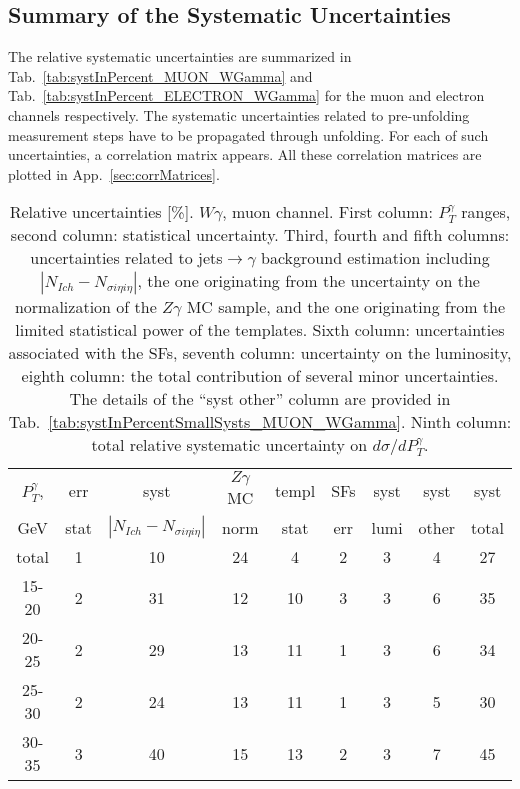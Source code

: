 \subsection{Summary of the Systematic Uncertainties}
\label{sec:Systematics_summary}

The relative systematic uncertainties are summarized in Tab.~\ref{tab:systInPercent_MUON_WGamma} and Tab.~\ref{tab:systInPercent_ELECTRON_WGamma} for the muon and electron channels respectively. The systematic uncertainties related to pre-unfolding measurement steps have to be propagated through unfolding. For each of such uncertainties, a correlation matrix appears. All these correlation matrices are plotted in App.~\ref{sec:corrMatrices}.

\begin{table}[h]
  \scriptsize
  \begin{center}
  \caption{Relative uncertainties [\%]. $W\gamma$, muon channel. First column: $P_T^{\gamma}$ ranges, second column: statistical uncertainty. Third, fourth and fifth columns: uncertainties related to jets$\rightarrow\gamma$ background estimation including $|N_{Ich}-N_{\sigma i\eta i\eta}|$, the one originating from the uncertainty on the normalization of the $Z\gamma$ MC sample, and the one originating from the limited statistical power of the templates. Sixth column: uncertainties associated with the SFs, seventh column: uncertainty on the luminosity, eighth column: the total contribution of several minor uncertainties. The details of the ``syst other'' column are provided in Tab.~\ref{tab:systInPercentSmallSysts_MUON_WGamma}. Ninth column: total relative systematic uncertainty on $d\sigma/dP_T^{\gamma}$.}
   \begin{tabular}{|c|c|c|c|c|c|c|c|c|}
    $P_T^{\gamma}$,  & err & syst                          & $Z\gamma$ MC & templ & SFs & syst & syst & syst\\
    GeV           & stat & $|N_{Ich}-N_{\sigma{i\eta i\eta}}|$ & norm         & stat  & err & lumi & other & total\\ \hline
    total  & 1 & 10 & 24 & 4 & 2 & 3 & 4 & 27 \\ \hline
    15-20 & 2 & 31 & 12 & 10 & 3 & 3 & 6 & 35 \\ \hline
    20-25 & 2 & 29 & 13 & 11 & 1 & 3 & 6 & 34 \\ \hline
    25-30 & 2 & 24 & 13 & 11 & 1 & 3 & 5 & 30 \\ \hline
    30-35 & 3 & 40 & 15 & 13 & 2 & 3 & 7 & 45 \\ \hline

\end{tabular}
\end{center}
\end{table}
